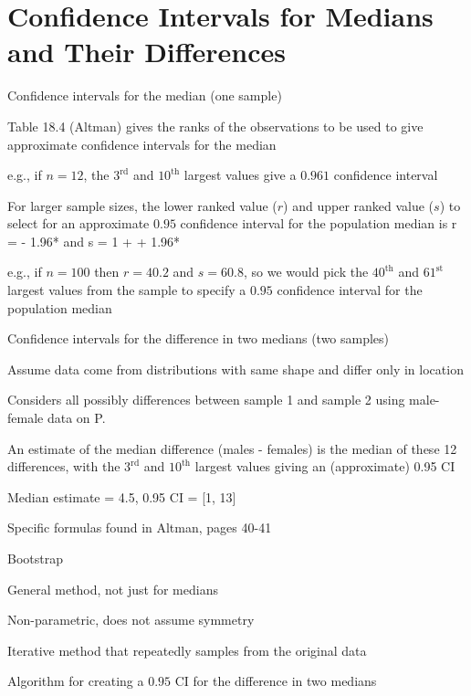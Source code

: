 \section{Confidence Intervals for Medians and Their Differences} \label{sec:nonpar-clmed}
\bi 
\item Confidence intervals for the median (one sample)
\bi 
\item Table 18.4 (Altman) gives the ranks of the observations to be
  used to give approximate confidence intervals for the median 
\item e.g., if $n = 12$, the $3^\textrm{rd}$ and $10^\textrm{th}$
  largest values give a $0.961$ confidence interval 
\item For larger sample sizes, the lower ranked value ($r$) and upper
  ranked value ($s$) to select for an approximate $0.95$ confidence
  interval for the population median is 
\beq
r =  - 1.96* \hspace{.4cm}\textrm{and}
\hspace{.4cm} s = 1 +  + 1.96* 
\eeq
\item e.g., if $n = 100$ then $r = 40.2$ and $s = 60.8$, so we would pick the $40^\textrm{th}$ and $61^\textrm{st}$ largest values from the sample to specify a $0.95$ confidence interval for the population median
\ei
\item Confidence intervals for the difference in two medians (two samples)
\bi
\item Assume data come from distributions with same shape and differ only in location
\item Considers all possibly differences between sample 1 and sample 2
  using male-female data on P.~\pageref{pg:nonpar-mf}
\item An estimate of the median difference (males - females) is the median of these 12 differences, with the $3^\textrm{rd}$ and $10^\textrm{th}$ largest values giving an (approximate) 0.95 CI
\item Median estimate = 4.5, 0.95 CI = [1, 13]
\item Specific formulas found in Altman, pages 40-41
\ei
\item Bootstrap 
\bi
\item General method, not just for medians
\item Non-parametric, does not assume symmetry
\item Iterative method that repeatedly samples from the original data
\item Algorithm for creating a $0.95$ CI for the difference in two medians
